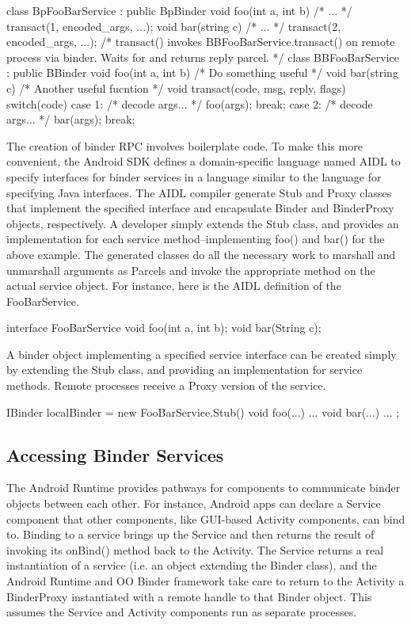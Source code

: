 \documentclass[prodmode]{acmlarge}
\begin{document}
\begin{snippet}
class BpFooBarService : public BpBinder {
  void foo(int a, int b) { /* ... */ transact(1, encoded_args, ...); }
  void bar(string c) { /* ... */ transact(2, encoded_args, ...); }
  /* transact() invokes BBFooBarService.transact() on remote process
     via binder. Waits for and returns reply parcel. */
}
class BBFooBarService : public BBinder {
  void foo(int a, int b) { /* Do something useful */ }
  void bar(string c) { /* Another useful fucntion */ }
  void transact(code, msg, reply, flags) {
    switch(code) {
      case 1: /* decode args... */ foo(args); break;
      case 2: /* decode args... */ bar(args); break;
}}}
\end{snippet}

The creation of binder RPC involves boilerplate code. To make this more convenient, the Android SDK defines a domain-specific language named AIDL to specify interfaces for binder services in a language similar to the language for specifying Java interfaces. The AIDL compiler generate Stub and Proxy classes that implement the specified interface and encapsulate Binder and BinderProxy objects, respectively. A developer simply extends the Stub class, and provides an implementation for each service method--implementing foo() and bar() for the above example. The generated classes do all the necessary work to marshall and unmarshall arguments as Parcels and invoke the appropriate method on the actual service object. For instance, here is the AIDL definition of the FooBarService.

\begin{snippet}
interface FooBarService { void foo(int a, int b); void bar(String c); }
\end{snippet}

A binder object implementing a specified service interface can be created simply by extending the Stub class, and providing an implementation for service methods. Remote processes receive a Proxy version of the service.

\begin{snippet}
IBinder localBinder = new FooBarService.Stub() { void foo(...) { ... }
                                                 void bar(...) { ... } };
\end{snippet}

\subsection{Accessing Binder Services}
The Android Runtime provides pathways for components to communicate binder objects between each other. For instance, Android apps can declare a Service component that other components, like GUI-based Activity components, can bind to. Binding to a service brings up the Service and then returns the result of invoking its onBind() method back to the Activity. The Service returns a real instantiation of a service (i.e. an object extending the Binder class), and the Android Runtime and OO Binder framework take care to return to the Activity a BinderProxy instantiated with a remote handle to that Binder object. This assumes the Service and Activity components run as separate processes.
\end{document}
